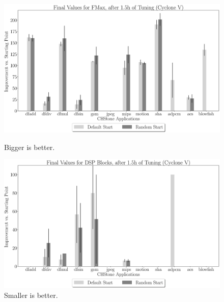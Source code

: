\documentclass[12pt, a4paper]{article}
\begin{document}
\begin{figure}[htpb]
    \centering
    \begin{minipage}{.48\textwidth}
        \centering
        \includegraphics[width=.8\textwidth]{abs_comp_fmax_5400_chstone_CycloneV}
        \caption{Bigger is better.}
    \end{minipage}%
    \begin{minipage}{.48\textwidth}
        \centering
        \includegraphics[width=.8\textwidth]{abs_comp_dsp_5400_chstone_CycloneV}
        \caption{Smaller is better.}
    \end{minipage}%


\end{figure}
\end{document}
